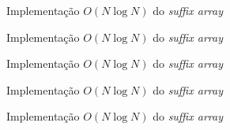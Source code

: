 \begin{frame}[fragile]{Implementação $O(N\log N)$ do {\it suffix array}}
\end{frame}

\begin{frame}[fragile]{Implementação $O(N\log N)$ do {\it suffix array}}
\end{frame}

\begin{frame}[fragile]{Implementação $O(N\log N)$ do {\it suffix array}}
\end{frame}

\begin{frame}[fragile]{Implementação $O(N\log N)$ do {\it suffix array}}
\end{frame}

\begin{frame}[fragile]{Implementação $O(N\log N)$ do {\it suffix array}}
\end{frame}
